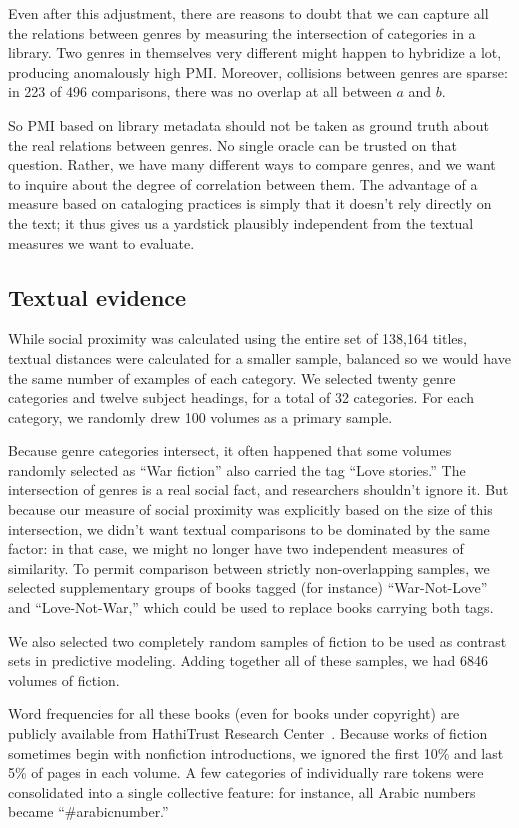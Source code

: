 \documentclass[11pt]{article}
\begin{document}
Even after this adjustment, there are reasons to doubt that we can capture all the relations between genres by measuring the intersection of categories in a library. Two genres in themselves very different might happen to hybridize a lot, producing anomalously high PMI. Moreover, collisions between genres are sparse: in 223 of 496 comparisons, there was no overlap at all between $a$ and $b$.

So PMI based on library metadata should not be taken as ground truth about the real relations between genres. No single oracle can be trusted on that question. Rather, we have many different ways to compare genres, and we want to inquire about the degree of correlation between them. The advantage of a measure based on cataloging practices is simply that it doesn't rely directly on the text; it thus gives us a yardstick plausibly independent from the textual measures we want to evaluate.

\subsection{Textual evidence}

While social proximity was calculated using the entire set of 138,164 titles, textual distances were calculated for a smaller sample, balanced so we would have the same number of examples of each category. We selected twenty genre categories and twelve subject headings, for a total of 32 categories. For each category, we randomly drew 100 volumes as a primary sample.

Because genre categories intersect, it often happened that some volumes randomly selected as ``War fiction'' also carried the tag ``Love stories.'' The intersection of genres is a real social fact, and researchers shouldn't ignore it. But because our measure of social proximity was explicitly based on the size of this intersection, we didn't want textual comparisons to be dominated by the same factor: in that case, we might no longer have two independent measures of similarity. To permit comparison between strictly non-overlapping samples, we selected supplementary groups of books tagged (for instance) ``War-Not-Love'' and ``Love-Not-War,'' which could be used to replace books carrying both tags. 

We also selected two completely random samples of fiction to be used as contrast sets in predictive modeling. Adding together all of these samples, we had 6846 volumes of fiction.

Word frequencies for all these books (even for books under copyright) are publicly available from HathiTrust Research Center~\cite{capitanu}. Because works of fiction sometimes begin with nonfiction introductions, we ignored the first 10\% and last 5\% of pages in each volume. A few categories of individually rare tokens were consolidated into a single collective feature: for instance, all Arabic numbers became ``\#arabicnumber.''
\end{document}
